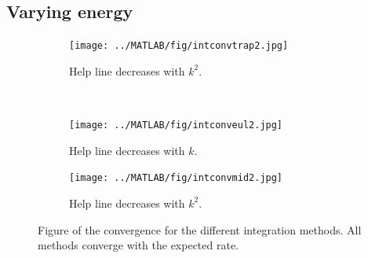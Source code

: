 \subsection{Varying energy}%
\begin{figure}[H]
        \centering
        \begin{subfigure}[b]{0.30\textwidth}
                \texttt{[image: ../MATLAB/fig/intconvtrap2.jpg]}
                \caption{ Help line decreases with $k^2$. }
                \label{fig:intconvtrap2}
        \end{subfigure}
        ~
        \begin{subfigure}[b]{0.30\textwidth}
                \texttt{[image: ../MATLAB/fig/intconveul2.jpg]}
                \caption{ Help line decreases with $k$. }
                \label{fig:intconveul2}
        \end{subfigure}
        \begin{subfigure}[b]{0.30\textwidth}
                \texttt{[image: ../MATLAB/fig/intconvmid2.jpg]}
                \caption{ Help line decreases with $k^2$. }
                \label{fig:intconvmid2}
        \end{subfigure}
\caption{Figure of the convergence for the different integration methods. All methods converge with the expected rate.}
\label{fig:intconv2}
\end{figure}
